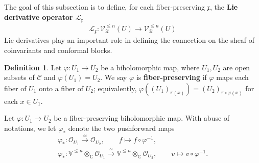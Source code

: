 \documentclass[11pt,b5paper,notitlepage]{article}
\theoremstyle{definition}
\newtheorem{df}{Definition}[subsection]
\theoremstyle{plain}
\newcommand{\mc}{\mathcal}
\newcommand{\ML}{\mathcal{L}}
\newcommand{\SV}{\mathscr{V}}
\newcommand{\xk}{\mathfrak x}
\newcommand{\Vbb}{\mathbb V}
\newcommand{\Cbb}{\mathbb C}
\newcommand{\<}{\left\langle}
\renewcommand{\>}{\right\rangle}
\newcommand{\MO}{\mathcal{O}}
\newcommand{\MU}{\mathcal{U}}
\newcommand{\MC}{\mathcal{C}}
\newcommand{\fx}{\mathfrak{X}}
\newcommand{\MV}{\mathcal{V}}
\numberwithin{equation}{subsection}
\begin{document}
The goal of this subsection is to define, for each fiber-preserving $\xk$, the \textbf{Lie derivative operator $\ML_\xk$}
\begin{align}\label{eqb15}
    \ML_\xk:\SV_\fx^{\leq n}(U)\rightarrow \SV_\fx^{\leq n}(U)
\end{align}
Lie derivatives play an important role in defining the connection on the sheaf of coinvariants and conformal blocks. 

\begin{df}
    Let $\varphi:U_1\rightarrow U_2$ be a biholomorphic map, where $U_1,U_2$ are open subsets of $\MC$ and $\varphi(U_1)=U_2$. We say $\varphi$ is \textbf{fiber-preserving} if $\varphi$ maps each fiber of $U_1$ onto a fiber of $U_2$; equivalently,  $\varphi((U_1)_{\pi(x)})=(U_2)_{\pi\circ \varphi(x)}$ for each $x\in U_1$.
\end{df}

Let $\varphi:U_1\rightarrow U_2$ be a fiber-preserving biholomorphic map. With abuse of notations, we let $\varphi_*$ denote the two pushforward maps
\begin{subequations}
\begin{gather}
    \varphi_*:\MO_{U_1}\xrightarrow{\simeq} \MO_{U_2},\qquad f\mapsto f\circ \varphi^{-1},\label{equiv1}\\
    \varphi_*:\Vbb^{\leq n}\otimes_\Cbb \MO_{U_1}\xrightarrow{\simeq} \Vbb^{\leq n}\otimes_\Cbb \MO_{U_2},\qquad v\mapsto v\circ \varphi^{-1}.\label{equiv2}
\end{gather}
\end{subequations}

\begin{comment}
Suppose that $\eta\in \MO(U_2)$ is univalent on each fiber. Then we have an equivalence 
\begin{align}
    (\eta,\pi)_*:\MO_{U_2}\xrightarrow{\simeq} \MO_{(\eta,\pi)(U_2)},\qquad f\mapsto f\circ (\eta,\pi)^{-1}.
\end{align}
Recall (cf. \cite[Sec. 1.7]{GZ1}) that the trivialization $\mc U_\varrho(\eta)=\eqref{eq175}$ gives a sheaf-isomorphism
\begin{equation}\label{equiv3}
    \begin{gathered}
     \MV_\varrho(\eta):\SV_\fx^{\leq n}\vert_{U_2} \xrightarrow{\simeq} \Vbb^{\leq n}\otimes_\Cbb \MO_{(\eta,\pi)(U_2)},\\
     \MV_\varrho(\eta)=(\eta,\pi)_* \MU_\varrho(\eta).
    \end{gathered}
\end{equation}
\end{comment}
\end{document}
